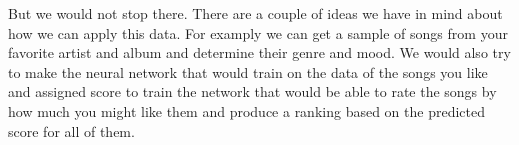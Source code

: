 \documentclass[12pt, oneside, a4paper]{article}
\begin{document}
    But we would not stop there. There are a couple of ideas we have in mind about how we can apply this data. For examply we can get a sample of songs from your favorite artist and album and determine their genre and mood. We would also try to make the neural network that would train on the data of the songs you like and assigned score to train the network that would be able to rate the songs by how much you might like them and produce a ranking based on the predicted score for all of them. 
\end{document}
